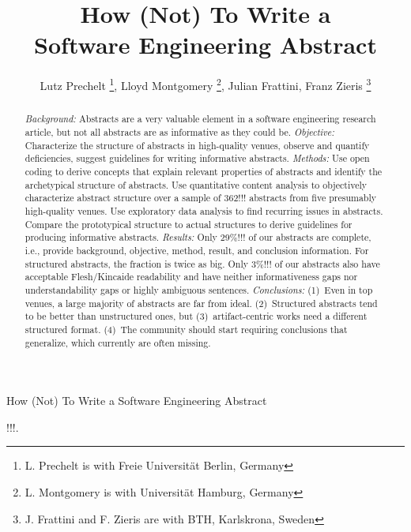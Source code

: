 \documentclass[10pt,journal,compsoc]{IEEEtran}
\begin{document}
\title{How (Not) To Write a\\Software Engineering Abstract}

\author{Lutz Prechelt%
\thanks{L. Prechelt is with Freie Universität Berlin, Germany},
Lloyd Montgomery%
\thanks{L. Montgomery is with Universität Hamburg, Germany},
Julian Frattini, Franz Zieris%
\thanks{J. Frattini and F. Zieris are with BTH, Karlskrona, Sweden}}

%
{How (Not) To Write a Software Engineering Abstract}

\maketitle

\begin{abstract}  %
\emph{Background:}
Abstracts are a very valuable element in a software engineering research article,
but not all abstracts are as informative as they could be.
\emph{Objective:}
Characterize the structure of abstracts in high-quality venues,
observe and quantify deficiencies,
suggest guidelines for writing informative abstracts.
\emph{Methods:}
Use open coding to derive concepts that explain relevant properties of abstracts
and identify the archetypical structure of abstracts.
Use quantitative content analysis to objectively characterize abstract structure
over a sample of 362!!! abstracts from five presumably high-quality venues.
Use exploratory data analysis to find recurring issues in abstracts.
Compare the prototypical structure to actual structures to derive
guidelines for producing informative abstracts.
\emph{Results:}
Only 29\%!!! of our abstracts are complete, i.e., provide background, objective,
method, result, and conclusion information.
For structured abstracts, the fraction is twice as big.
Only 3\%!!! of our abstracts also have acceptable Flesh/Kincaide readability and have
neither informativeness gaps nor understandability gaps or highly ambiguous sentences.
\emph{Conclusions:}
(1)~Even in top venues, a large majority of abstracts are far from ideal.
(2)~Structured abstracts tend to be better than unstructured ones,
but (3)~artifact-centric works need a different structured format.
(4)~The community should start requiring conclusions that generalize,
which currently are often missing.
\end{abstract}

\begin{IEEEkeywords}
!!!.
\end{IEEEkeywords}
\end{document}

